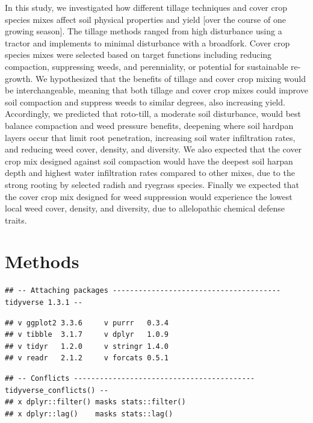 \documentclass[
]{article}
\begin{document}
\hfill\break

In this study, we investigated how different tillage techniques and cover crop species mixes affect soil physical properties and yield {[}over the course of one growing season{]}.
The tillage methods ranged from high disturbance using a tractor and implements to minimal disturbance with a broadfork.
Cover crop species mixes were selected based on target functions including reducing compaction, suppressing weeds, and perenniality, or potential for sustainable re-growth.
We hypothesized that the benefits of tillage and cover crop mixing would be interchangeable, meaning that both tillage and cover crop mixes could improve soil compaction and suppress weeds to similar degrees, also increasing yield.
Accordingly, we predicted that roto-till, a moderate soil disturbance, would best balance compaction and weed pressure benefits, deepening where soil hardpan layers occur that limit root penetration, increasing soil water infiltration rates, and reducing weed cover, density, and diversity.
We also expected that the cover crop mix designed against soil compaction would have the deepest soil harpan depth and highest water infiltration rates compared to other mixes, due to the strong rooting by selected radish and ryegrass species.
Finally we expected that the cover crop mix designed for weed suppression would experience the lowest local weed cover, density, and diversity, due to allelopathic chemical defense traits.

\hypertarget{methods}{%
\section{Methods}\label{methods}}

\begin{verbatim}
## -- Attaching packages --------------------------------------- tidyverse 1.3.1 --
\end{verbatim}

\begin{verbatim}
## v ggplot2 3.3.6     v purrr   0.3.4
## v tibble  3.1.7     v dplyr   1.0.9
## v tidyr   1.2.0     v stringr 1.4.0
## v readr   2.1.2     v forcats 0.5.1
\end{verbatim}

\begin{verbatim}
## -- Conflicts ------------------------------------------ tidyverse_conflicts() --
## x dplyr::filter() masks stats::filter()
## x dplyr::lag()    masks stats::lag()
\end{verbatim}
\end{document}

